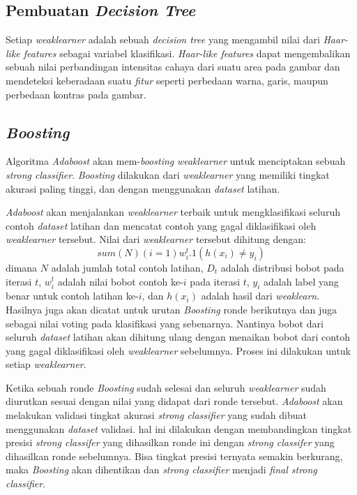 \subsection{Pembuatan \textit{Decision Tree}}

Setiap \emph{weaklearner} adalah sebuah \emph{decision tree} yang mengambil nilai 
dari \emph{Haar-like features} sebagai variabel klasifikasi.
\emph{Haar-like features} dapat mengembalikan 
sebuah nilai perbandingan intensitas cahaya dari suatu area pada gambar dan 
mendeteksi keberadaan suatu \emph{fitur} seperti 
perbedaan warna, garis, maupun perbedaan kontras pada gambar. 

\subsection{\emph{Boosting}}

Algoritma \emph{Adaboost} akan mem-\emph{boosting} \emph{weaklearner} untuk 
menciptakan sebuah \emph{strong classifier}. \emph{Boosting} dilakukan dari 
\emph{weaklearner} yang memiliki tingkat akurasi paling tinggi, dan dengan 
menggunakan \emph{dataset} latihan.

\emph{Adaboost} akan menjalankan \emph{weaklearner} terbaik untuk 
mengklasifikasi seluruh contoh \emph{dataset} latihan dan mencatat contoh yang 
gagal diklasifikasi oleh \emph{weaklearner} tersebut. 
Nilai dari \emph{weaklearner} 
tersebut dihitung dengan:
\begin{equation}
  sum(N)(i=1) w^t_i.1(h(x_i)\ne y_i)
\end{equation} 
dimana $N$ adalah jumlah total contoh latihan, $D_t$ adalah distribusi bobot pada 
iterasi $t$, $w^t_i$ adalah nilai bobot contoh ke-$i$ pada iterasi $t$, 
$y_i$ adalah label yang benar untuk contoh latihan ke-$i$, dan $h(x_i)$ 
adalah hasil dari \emph{weaklearn}. 
Hasilnya juga akan dicatat untuk urutan \emph{Boosting} ronde berikutnya dan 
juga sebagai nilai voting pada klasifikasi yang sebenarnya. 
Nantinya bobot dari seluruh \emph{dataset} latihan akan dihitung ulang dengan menaikan bobot dari contoh 
yang gagal diklasifikasi oleh \emph{weaklearner} sebelumnya. Proses ini dilakukan 
untuk setiap \emph{weaklearner}. 

Ketika sebuah ronde \emph{Boosting} sudah selesai dan seluruh \emph{weaklearner} sudah  diurutkan sesuai dengan 
nilai yang didapat dari ronde tersebut. \emph{Adaboost} akan melakukan validasi 
tingkat akurasi \emph{strong classifier} yang sudah dibuat menggunakan \emph{dataset} validasi. 
hal ini dilakukan dengan membandingkan tingkat presisi \emph{strong classifer} 
yang dihasilkan ronde ini dengan \emph{strong classifer} yang dihasilkan ronde 
sebelumnya. Bisa tingkat presisi ternyata semakin berkurang, maka \emph{Boosting} 
akan dihentikan dan \emph{strong classifier} 
menjadi \emph{final strong classifier}.

